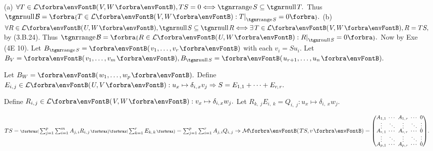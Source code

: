 (a) $\forall T\in\Lm{V,W},TS=0\Longleftrightarrow\range S\subseteq\null T.$ Thus $\null\mB=\Bra{T\in\Lm{V,W}:T\mmid_{\range S}=0}.$\parSol{\vspace{2pt}}
(b) $\forall R\in\Lm{U,W},\null S\subseteq\null R\Longleftrightarrow\exists\,T\in\Lm{V,W},R=TS,$ by (3.B.24).\parSol{\Hb}
Thus $\range\mB=\Bra{R\in\Lm{U,W}:R\mmid_{\null S}=0}.$ \;Now by Exe (4E 10).\PfEnd\vspace{4pt}\quad
\Or Let $B_{\range S}=\Par{v_1,\dots,v_r}$ with each $v_i=Su_i.$ Let $B_V=\Par{v_1,\dots,v_m},B_{\null S}=\Par{u_{r+1},\dots,u_n}.$\par\quad
Let $B_W=\Par{w_1,\dots,w_p}.$ Define $E_{i,\;\!j}\in\Lm{U,V}:u_x\mapsto\delta_{i,\;\!x}v_j\Rightarrow S=E_{1,1}+\dots+E_{r\:\!\!,\;\!r}.$\par\quad
Define $R_{i,\;\!j}\in\Lm{V,W}:v_x\mapsto\delta_{i,\;\!x}w_j.$ Let $R_{k,\;\!j}E_{i,\;\!k}=Q_{i,\;\!j}:u_x\mapsto\delta_{i,\;\!x}w_j.$\par\vspace{-20pt}\quad
$TS=\XPar{{\sum_{j=1}^p\sum_{i=1}^m A_{j,\;\!i}R_{i,\;\!j}}}\XPar{{\sum_{k=1}^r E_{k,\;\!k}}}=\sum_{j=1}^p\sum_{i=1}^r A_{j,\;\!i}Q_{i,\;\!j}\Rightarrow\Mt{TS,v}={\small\begin{pmatrix}
		A_{1,1} &\hspace{-6pt} \cdots &\hspace{-6pt} A_{1,\;\!r} &\hspace{-6pt} \cdots &\hspace{-6pt} 0\\[-2pt]
		\vdots  &\hspace{-6pt} \ddots &\hspace{-6pt} \vdots  &\hspace{-6pt} \ddots &\hspace{-6pt} \vdots\\[-4pt]
		A_{r\:\!\!,\;\!1} &\hspace{-6pt} \cdots &\hspace{-6pt} A_{r\:\!\!,\;\!r} &\hspace{-6pt} \cdots &\hspace{-6pt} 0\\[-2pt]
		\vdots  &\hspace{-6pt} \ddots &\hspace{-6pt} \vdots  &\hspace{-6pt} \ddots &\hspace{-6pt} \vdots\\[-4pt]
		A_{p,1} &\hspace{-6pt} \cdots &\hspace{-6pt} A_{p,\;\!r} &\hspace{-6pt} \cdots &\hspace{-6pt} 0\end{pmatrix}}.$\par\vspace{-20pt}\quad
